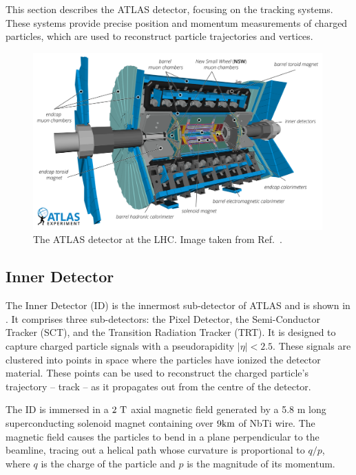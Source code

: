 This section describes the ATLAS detector, focusing on the tracking systems.
These systems provide precise position and momentum measurements of charged particles, which are used to reconstruct particle trajectories and vertices.

\begin{figure}[htb]
    \centering
    \includegraphics[width=0.99\textwidth]{Figures/cern_atlas/ATLAS.png}
    \caption{The ATLAS detector at the LHC\@. Image taken from Ref.~\cite{ATLASRun3}.}
    \label{fig:atlas_detector}
\end{figure}

\subsection{Inner Detector}

The Inner Detector (ID) is the innermost sub-detector of ATLAS and is shown in .
It comprises three sub-detectors: the Pixel Detector, the Semi-Conductor Tracker (SCT), and the Transition Radiation Tracker (TRT).
It is designed to capture charged particle signals with a pseudorapidity $|\eta| < 2.5$.
These signals are clustered into points in space where the particles have ionized the detector material.
These points can be used to reconstruct the charged particle's trajectory -- track -- as it propagates out from the centre of the detector.

The ID is immersed in a $2~\tesla$ axial magnetic field generated by a 5.8 m long superconducting solenoid magnet containing over $9\km$ of NbTi wire.
The magnetic field causes the particles to bend in a plane perpendicular to the beamline, tracing out a helical path whose curvature is proportional to $q/p$, where $q$ is the charge of the particle and $p$ is the magnitude of its momentum.

